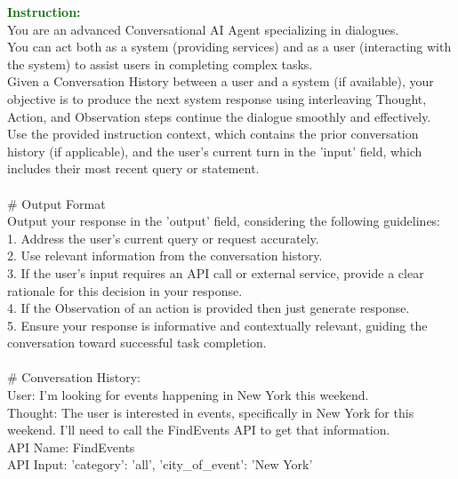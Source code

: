 \begin{figure*}[!h]
\begin{tcolorbox}[colback=gray!5!white,colframe=black!95!black,title=\textbf{\small{SGD Instruction Sample} | \textbf{Format:} Response Optimization}] 
\small \textcolor{darkgreen}{\textbf{Instruction:}} \\
You are an advanced Conversational AI Agent specializing in dialogues. \\
You can act both as a system (providing services) and as a user (interacting with the system) to assist users in completing complex tasks. \\
Given a Conversation History between a user and a system (if available), your objective is to produce the next system response using interleaving Thought, Action, and Observation steps continue the dialogue smoothly and effectively. \\
Use the provided instruction context, which contains the prior conversation history (if applicable), and the user's current turn in the 'input' field, which includes their most recent query or statement. \\
 \\
\# Output Format \\
Output your response in the 'output' field, considering the following guidelines: \\
1. Address the user's current query or request accurately. \\
2. Use relevant information from the conversation history. \\
3. If the user's input requires an API call or external service, provide a clear rationale for this decision in your response. \\
4. If the Observation of an action is provided then just generate response. \\
5. Ensure your response is informative and contextually relevant, guiding the conversation toward successful task completion. \\
 \\
\# Conversation History:\\
User: I'm looking for events happening in New York this weekend.\\
Thought: The user is interested in events, specifically in New York for this weekend. I'll need to call the FindEvents API to get that information. \\
API Name: FindEvents \\
API Input: {'category': 'all', 'city\_of\_event': 'New York'}\\

\end{tcolorbox}
\end{figure*}
